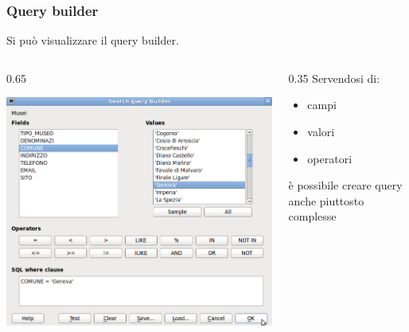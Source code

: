 \documentclass{beamer}
\begin{document}
{ \begin{frame}
   \frametitle{Query builder}
   Si può visualizzare il query builder.
	 \begin{columns}
		\begin{column} {0.65\textwidth}	
			  \begin{center}
			\includegraphics[width=1\textwidth] {topology_attrmanagement_pics/query.png}
		    \end{center}
		\end{column}
		
		\begin{column} {0.35\textwidth}	
  			Servendosi di: 
  			\begin{itemize}
  				\item campi
  				\item valori 
  				\item operatori
  			\end{itemize}
  			è possibile creare query anche piuttosto complesse
		  \end{column}
	  \end{columns}   
		    
\end{frame}



}
\end{document}
